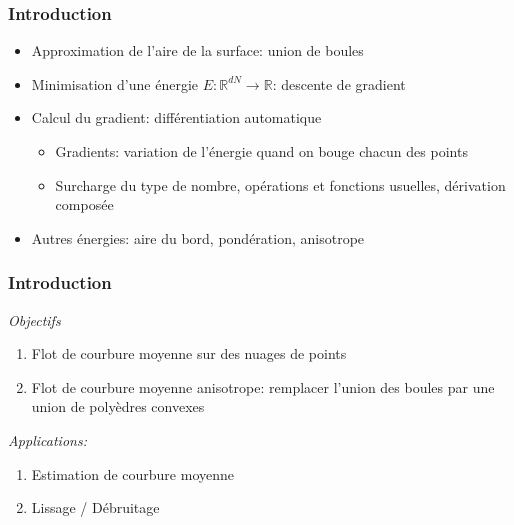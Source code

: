 \documentclass{beamer}
\newcommand{\R}{\mathbb{R}}
\begin{document}
\begin{frame}
    \frametitle{Introduction}

    \begin{itemize}
        \item Approximation de l'aire de la surface: union de boules
        \item Minimisation d'une énergie $ E : \R^{dN} \to \R $: descente de gradient
        \item Calcul du gradient: différentiation automatique
            \begin{itemize}
                \item Gradients: variation de l'énergie quand on bouge chacun
                    des points
                \item Surcharge du type de nombre, opérations et fonctions
                    usuelles, dérivation composée
            \end{itemize}
        \item Autres énergies: aire du bord, pondération, anisotrope
    \end{itemize}
\end{frame}

\begin{frame}
    \frametitle{Introduction}

    \emph{Objectifs}
    \begin{enumerate}
        \item Flot de courbure moyenne sur des nuages de points
        \item Flot de courbure moyenne anisotrope: remplacer l'union des boules
            par une union de polyèdres convexes
    \end{enumerate}

    \emph{Applications:}
    \begin{enumerate}
        \item Estimation de courbure moyenne
        \item Lissage / Débruitage
    \end{enumerate}
\end{frame}


\end{document}
